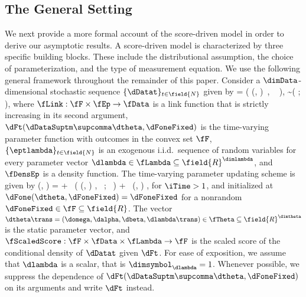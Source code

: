 \subsection{The General Setting} \label{sec2.3}
We next provide a more formal account of the score-driven model in order to derive our asymptotic results.
A score-driven model is characterized by three specific building blocks. 
These include the distributional assumption, the choice of parameterization, and the type of measurement equation. 
We use the following general framework throughout the remainder of this paper.
Consider a $\dimData$-dimensional stochastic sequence $\{\dDatat\}_{t \in \field{N}}$ given by
    \dDatat = 
    \fLink \big(
        \dFt(\dDataSuptm\supcomma \dtheta, \dFoneFixed)\ , \ \eptlambda
    \big),
    \qquad 
    \eptlambda \sim \fDensEp \big( \eptlambda; \dlambda \big),
\eq
where $\fLink:\fF \times \fEp \to \fData$ is a link function that is strictly increasing in its second argument,
$\dFt(\dDataSuptm\supcomma \dtheta, \dFoneFixed)$ is the time-varying parameter function
with outcomes in the convex set $\fF$, 
$\{ \eptlambda \} _{t \in \field{N}}$ is an exogenous i.i.d.\ sequence of random variables for every
parameter vector 
$\dlambda \in \fLambda \subseteq \field{R}^{\dimlambda}$, and
$\fDensEp$ is a density function.  
The time-varying parameter updating scheme is given by
    \dFtp(\dDataSupt\supcomma \dtheta, \dFoneFixed) = \domega + \dalpha\,  
    \fScaledScore	 \big(
        \dFt(\dDataSuptm\supcomma \dtheta, \dFoneFixed) , \dDatat \, ; \, \dlambda 
    \big) + 
    \dbeta\, \dFt(\dDataSuptm\supcomma \dtheta, \dFoneFixed) ,
\eq
for $\iTime > 1$, and initialized at
$
    \dFone(\dtheta, \dFoneFixed) = \dFoneFixed    
$
for a nonrandom $\dFoneFixed \in \fF \subseteq \field{R}$.
The vector $\dtheta\trans =(\domega,\dalpha,\dbeta, \dlambda\trans) \in \fTheta \subseteq \field{R}^{\dimtheta}$
is the static parameter vector,
and $\fScaledScore: \fF \times \fData \times \fLambda \to \fF$ is the scaled score of the conditional density of $\dDatat$ given $\dFt$.
For ease of exposition, we assume that $\dlambda$ is a scalar, that is $\dimsymbol_{\dlambda}=1$.
Whenever possible, we suppress the dependence of %
$\dFt(\dDataSuptm\supcomma \dtheta,\dFoneFixed)$ on 
its arguments
and write %
$\dFt$ instead. %


